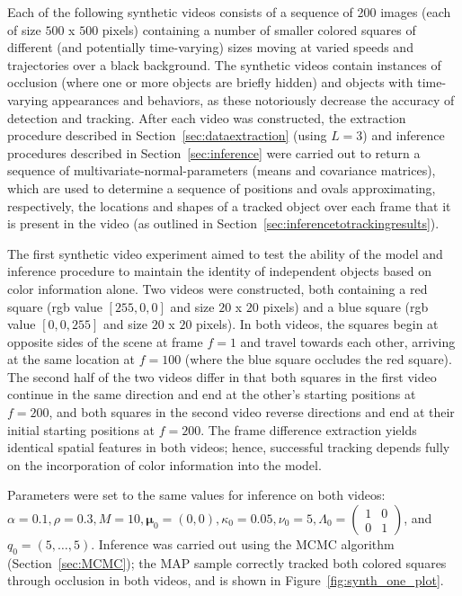 \documentclass[twocolumn, final]{svjour3}
\begin{document}
Each of the following synthetic videos consists of a sequence of 200 images (each of size $500$ x $500$ pixels) containing a number of smaller colored squares of different (and potentially time-varying) sizes moving at varied speeds and trajectories over a black background. The synthetic videos contain instances of occlusion (where one or more objects are briefly hidden) and objects with time-varying appearances and behaviors, as these notoriously decrease the accuracy of detection and tracking. After each video was constructed, the extraction procedure described in Section~\ref{sec:dataextraction} (using $L=3$) and inference procedures described in Section~\ref{sec:inference} were carried out to return a sequence of multivariate-normal-parameters (means and covariance matrices), which are used to determine a sequence of positions and ovals approximating, respectively, the locations and shapes of a tracked object over each frame that it is present in the video (as outlined in Section~\ref{sec:inferencetotrackingresults}).

The first synthetic video experiment aimed to test the ability of the model and inference procedure to maintain the identity of independent objects based on color information alone. Two videos were constructed, both containing a red square (rgb value $[255,0,0]$ and size $20$ x $20$ pixels) and a blue square (rgb value $[0,0,255]$ and size $20$ x $20$ pixels). In both videos, the squares begin at opposite sides of the scene at frame $f=1$ and travel towards each other, arriving at the same location at $f=100$ (where the blue square occludes the red square). The second half of the two videos differ in that both squares in the first video continue in the same direction and end at the other's starting positions at $f=200$, and both squares in the second video reverse directions and end at their initial starting positions at $f=200$. The frame difference extraction yields identical spatial features in both videos; hence, successful tracking depends fully on the incorporation of color information into the model.

Parameters were set to the same values for inference on both videos: $\alpha = 0.1, \rho = 0.3, M = 10, \boldsymbol{\mu}_{0} = (0,0), \kappa_{0} = 0.05, \nu_{0} = 5, \Lambda_{0} = \left( \begin{smallmatrix} 1&0\\ 0&1 \end{smallmatrix} \right)$, and $q_{0} = (5, \ldots, 5)$. Inference was carried out using the MCMC algorithm (Section~\ref{sec:MCMC}); the MAP sample correctly tracked both colored squares through occlusion in both videos, and is shown in Figure~\ref{fig:synth_one_plot}. 
\end{document}
